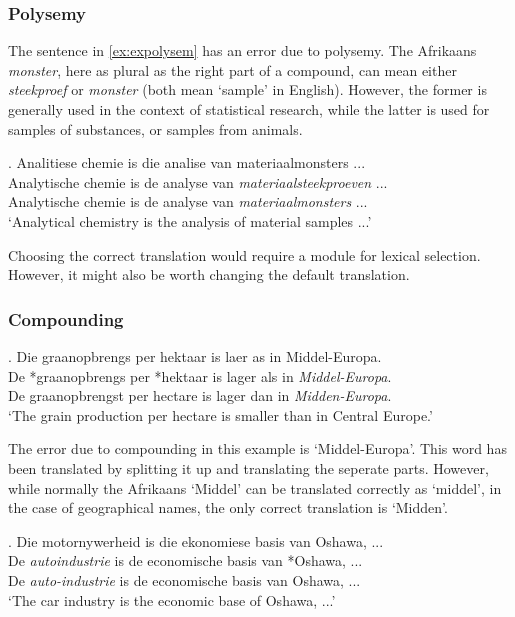 \documentclass[11pt]{article}
\begin{document}
\subsubsection{Polysemy}

The sentence in \ref{ex:expolysem} has an error due to polysemy. The Afrikaans {\em monster}, here 
as plural as the right part of a compound, can mean either {\em steekproef} or {\em monster} (both 
mean `sample' in English). However, the former is generally used in the context of statistical 
research, while the latter is used for samples of substances, or samples from animals. 

\ex. \label{ex:expolysem} 
    Analitiese chemie is die analise van materiaalmonsters ... \\
    Analytische chemie is de analyse van {\em materiaalsteekproeven} ... \\
    Analytische chemie is de analyse van {\em materiaalmonsters} ... \\
   `Analytical chemistry is the analysis of material samples ...'

Choosing the correct translation would require a module for lexical selection. However, it might also
be worth changing the default translation.

\subsubsection{Compounding}

\ex. \label{ex:excompsplit} 
    Die graanopbrengs per hektaar is laer as in Middel-Europa. \\
    De *graanopbrengs per *hektaar is lager als in {\em Middel-Europa}. \\
    De graanopbrengst per hectare is lager dan in {\em Midden-Europa}. \\
   `The grain production per hectare is smaller than in Central Europe.'

The error due to compounding in this example is `Middel-Europa'. This word has been translated by splitting it up and translating the seperate parts.
 However, while normally the Afrikaans `Middel' can be translated correctly as `middel', in the case of geographical names, the only correct translation is `Midden'.

\ex. \label{ex:excomphyphen} 
    Die motornywerheid is die ekonomiese basis van Oshawa, ...  \\
    De {\em autoindustrie} is de economische basis van *Oshawa, ... \\
    De {\em auto-industrie} is de economische basis van Oshawa, ... \\
   `The car industry is the economic base of Oshawa, ...'
\end{document}
